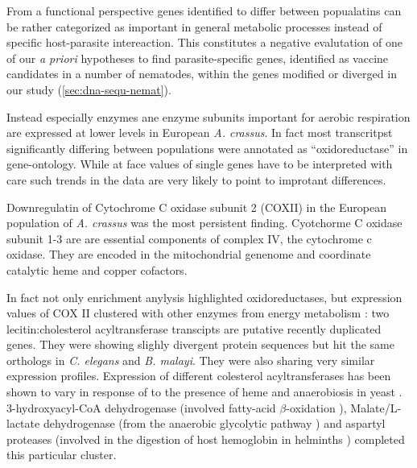 From a functional perspective genes identified to differ between
popualatins can be rather categorized as important in general
metabolic processes instead of specific host-parasite intereaction.
This constitutes a negative evalutation of one of our \textit{a
  priori} hypotheses to find parasite-specific genes, identified as
vaccine candidates in a number of nematodes, within the genes modified
or diverged in our study (\ref{sec:dna-sequ-nemat}).


Instead especially enzymes ane enzyme subunits important for aerobic
respiration are expressed at lower levels in European
\textit{A. crassus}. In fact most transcritpst significantly differing
between populations were annotated as ``oxidoreductase'' in
gene-ontology. While at face values of single genes have to be
interpreted with care such trends in the data are very likely to point
to improtant differences.

Downregulatin of Cytochrome C oxidase subunit 2 (COXII) in the
European population of \textit{A. crassus} was the most persistent
finding. Cyotchorme C oxidase subunit 1-3 are are essential components
of complex IV, the cytochrome c oxidase. They are encoded in the
mitochondrial genenome and coordinate catalytic heme and copper
cofactors.

In fact not only enrichment anylysis highlighted oxidoreductases, but
expression values of COX II clustered with other enzymes from energy
metabolism : two lecitin:cholesterol acyltransferase transcipts are
putative recently duplicated genes. They were showing slighly
divergent protein sequences but hit the same orthologs in
\textit{C. elegans} and \textit{B. malayi}. They were also sharing
very similar expression profiles. Expression of different colesterol
acyltransferases has been shown to vary in response of to the presence
of heme and anaerobiosis in yeast
\cite{pmid11786267}. 3-hydroxyacyl-CoA dehydrogenase (involved
fatty-acid $\beta$-oxidation \cite{pmid8454629}), Malate/L-lactate
dehydrogenase (from the anaerobic glycolytic pathway
\cite{sturm1969vergleichende}) and aspartyl proteases (involved in the
digestion of host hemoglobin in helminths \cite{pmid12782060})
completed this particular cluster.

